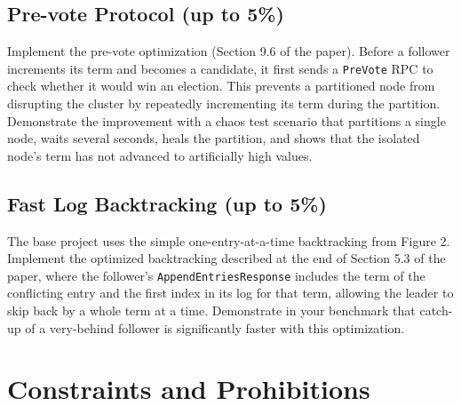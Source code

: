 \documentclass[11pt,a4paper]{article}
\begin{document}
\subsection{Pre-vote Protocol (up to 5\%)}
Implement the pre-vote optimization (Section 9.6 of the paper). Before a follower increments its term and becomes a candidate, it first sends a \texttt{PreVote} RPC to check whether it would win an election. This prevents a partitioned node from disrupting the cluster by repeatedly incrementing its term during the partition. Demonstrate the improvement with a chaos test scenario that partitions a single node, waits several seconds, heals the partition, and shows that the isolated node's term has not advanced to artificially high values.

\subsection{Fast Log Backtracking (up to 5\%)}
The base project uses the simple one-entry-at-a-time backtracking from Figure 2. Implement the optimized backtracking described at the end of Section 5.3 of the paper, where the follower's \texttt{AppendEntriesResponse} includes the term of the conflicting entry and the first index in its log for that term, allowing the leader to skip back by a whole term at a time. Demonstrate in your benchmark that catch-up of a very-behind follower is significantly faster with this optimization.

\section{Constraints and Prohibitions}
\end{document}
